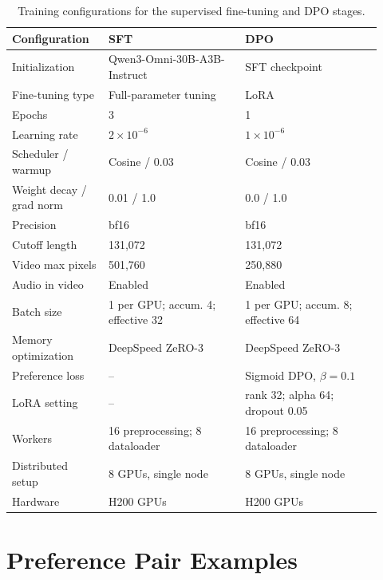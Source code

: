 \begin{table}[t]
\centering
\caption{Training configurations for the supervised fine-tuning and DPO stages.}
\vspace{3pt}
\label{tab:training-config}
\footnotesize
\setlength{\tabcolsep}{5pt}
\renewcommand{\arraystretch}{1.12}
\begin{tabular}{p{0.24\linewidth}p{0.34\linewidth}p{0.34\linewidth}}
\toprule
\textbf{Configuration} & \textbf{SFT} & \textbf{DPO} \\
\midrule
Initialization 
& Qwen3-Omni-30B-A3B-Instruct 
& SFT checkpoint \\
Fine-tuning type 
& Full-parameter tuning 
& LoRA \\
Epochs 
& 3 
& 1 \\
\midrule
Learning rate 
& $2\times 10^{-6}$ 
& $1\times 10^{-6}$ \\
Scheduler / warmup 
& Cosine / 0.03 
& Cosine / 0.03 \\
Weight decay / grad norm 
& 0.01 / 1.0 
& 0.0 / 1.0 \\
Precision 
& bf16 
& bf16 \\
\midrule
Cutoff length 
& 131,072 
& 131,072 \\
Video max pixels 
& 501,760 
& 250,880 \\
Audio in video 
& Enabled 
& Enabled \\
\midrule
Batch size 
& 1 per GPU; accum. 4; effective 32 
& 1 per GPU; accum. 8; effective 64 \\
Memory optimization 
& DeepSpeed ZeRO-3 
& DeepSpeed ZeRO-3 \\
\midrule
Preference loss 
& -- 
& Sigmoid DPO, $\beta=0.1$ \\
LoRA setting 
& -- 
& rank 32; alpha 64; dropout 0.05 \\
\midrule
Workers 
& 16 preprocessing; 8 dataloader 
& 16 preprocessing; 8 dataloader \\
Distributed setup 
& 8 GPUs, single node 
& 8 GPUs, single node \\
Hardware 
& H200 GPUs 
& H200 GPUs \\
\bottomrule
\end{tabular}
\end{table}

\section{Preference Pair Examples}
\label{app:preference_examples}

